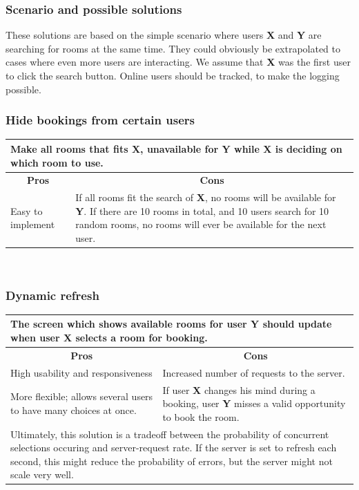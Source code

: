 \subsubsection*{Scenario and possible solutions}
These solutions are based on the simple scenario where users \textbf{X} and \textbf{Y} are searching for rooms at the same time. They could obviously be extrapolated to cases where even more users are interacting. We assume that \textbf{X} was the first user to click the search button. Online users should be tracked, to make the logging possible.
\subsubsection*{Hide bookings from certain users}
\begin{tabular}{|p{6cm}|p{6cm}|}
\hline 
	\multicolumn{2}{|p{12cm}|}{Make all rooms that fits \textbf{X}, unavailable for \textbf{Y} while \textbf{X} is deciding on which room to use.} \\ \hline \hline
	\multicolumn{1}{|c|}{\textbf{Pros}} & \multicolumn{1}{c|}{\textbf{Cons}} \\ \hline
	Easy to implement & If all rooms fit the search of \textbf{X}, no rooms will be available for \textbf{Y}. If there are 10 rooms in total, and 10 users search for 10 random rooms, no rooms will ever be available for the next user. \\
	\hline
\end{tabular}
\\
\subsubsection*{Dynamic refresh}
\begin{tabular}{|p{6cm}|p{6cm}|}
\hline
	\multicolumn{2}{|p{12cm}|}{The screen which shows available rooms for user \textbf{Y} should update when user \textbf{X} selects a room for booking.} \\ \hline \hline
	\multicolumn{1}{|c|}{\textbf{Pros}} & \multicolumn{1}{c|}{\textbf{Cons}} \\ \hline
	High usability and responsiveness & Increased number of requests to the server. \\ \hline
	More flexible; allows several users to have many choices at once. & If user \textbf{X} changes his mind during a booking, user \textbf{Y} misses a valid opportunity to book the room.\\
	\hline
	\multicolumn{2}{|p{12cm}|}{Ultimately, this solution is a tradeoff between the probability of concurrent selections occuring and server-request rate. If the server is set to refresh each second, this might reduce the probability of errors, but the server might not scale very well.} \\
	\hline
\end{tabular}
